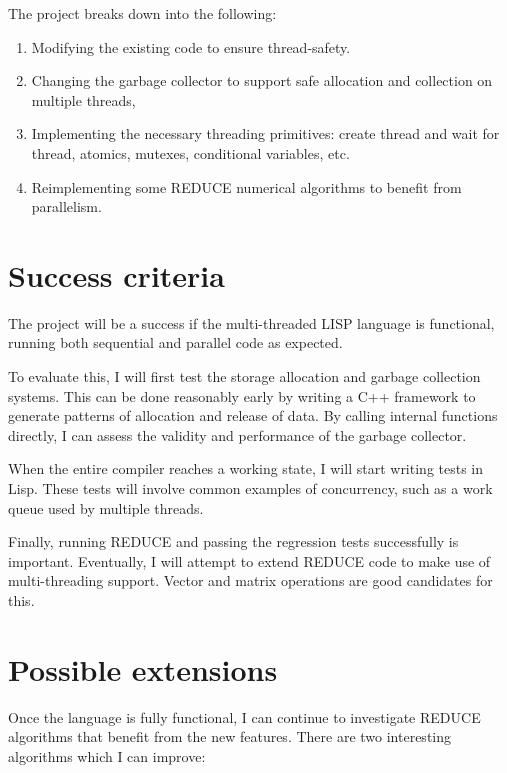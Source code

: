 \documentclass[12pt,a4paper,twoside]{article}
\begin{document}
The project breaks down into the following:

\begin{enumerate}

\item Modifying the existing code to ensure thread-safety.

\item Changing the garbage collector to support safe allocation and
collection on multiple threads,

\item Implementing the necessary threading primitives: create thread and
wait for thread, atomics, mutexes, conditional variables, etc. 

\item Reimplementing some REDUCE numerical algorithms to benefit from parallelism.

\end{enumerate}

\section*{Success criteria}

The project will be a success if the multi-threaded LISP language is functional,
running both sequential and parallel code as expected.

To evaluate this, I will first test the storage allocation and garbage
collection systems. This can be done reasonably early by writing a C++ framework
to generate patterns of allocation and release of data. By calling  internal
functions directly, I can assess the validity and performance of the
garbage collector.

When the entire compiler reaches a working state, I will start writing tests
in Lisp. These tests will involve common examples of concurrency, such as a
work queue used by multiple threads.

Finally, running REDUCE and passing the regression tests successfully is
important. Eventually, I will attempt to extend REDUCE code to make use
of multi-threading support. Vector and matrix operations are good candidates
for this.

\section*{Possible extensions}

Once the language is fully functional, I can continue to investigate REDUCE
algorithms that benefit from the new features. There are two interesting
algorithms which I can improve:
\end{document}
